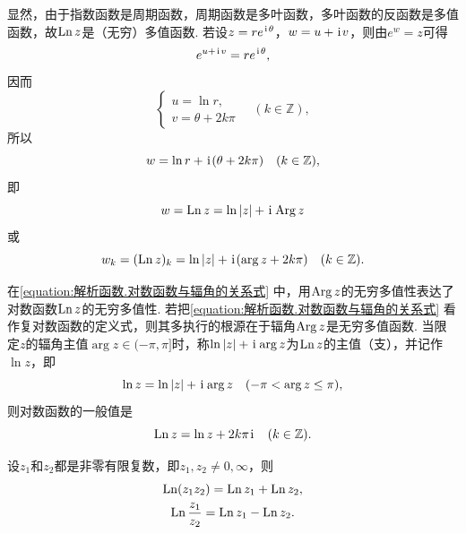 显然，由于指数函数是周期函数，周期函数是多叶函数，多叶函数的反函数是多值函数，故\(\operatorname{Ln} z\)是（无穷）多值函数.
若设\(z = r e^{\kern1pt\mathrm{i}\kern1pt\theta}\)，\(w = u + \kern1pt\mathrm{i}\kern1pt v\)，则由\(e^w = z\)可得\begin{equation*}
e^{u + \kern1pt\mathrm{i}\kern1pt v} = r e^{\kern1pt\mathrm{i}\kern1pt\theta},
\end{equation*}因而\begin{equation*}
\left\{ \begin{array}{l}
u = \ln r, \\
v = \theta+2k\pi
\end{array} \right.
\quad(k\in\mathbb{Z}),
\end{equation*}所以\begin{equation*}
w = \ln r + \kern1pt\mathrm{i}\kern1pt(\theta+2k\pi)
\quad(k\in\mathbb{Z}),
\end{equation*}即\begin{equation}\label{equation:解析函数.对数函数与辐角的关系式}
w = \operatorname{Ln} z = \ln\abs{z} + \kern1pt\mathrm{i}\kern1pt \operatorname{Arg} z
\end{equation}或\begin{equation*}
w_k = (\operatorname{Ln} z)_k = \ln\abs{z} + \kern1pt\mathrm{i}\kern1pt(\arg z + 2k\pi)
\quad(k\in\mathbb{Z}).
\end{equation*}

在\cref{equation:解析函数.对数函数与辐角的关系式} 中，用\(\operatorname{Arg} z\)的无穷多值性表达了对数函数\(\operatorname{Ln} z\)的无穷多值性.
若把\cref{equation:解析函数.对数函数与辐角的关系式} 看作复对数函数的定义式，则其多执行的根源在于辐角\(\operatorname{Arg} z\)是无穷多值函数.
当限定\(z\)的辐角主值\(\arg z \in (-\pi,\pi]\)时，称\(\ln\abs{z}+\kern1pt\mathrm{i}\kern1pt\arg z\)为\(\operatorname{Ln} z\)的主值（支），并记作\(\ln z\)，即\begin{equation}\label{equation:解析函数.对数函数的主值支}
\ln z = \ln\abs{z} + \kern1pt\mathrm{i}\kern1pt\arg z
\quad(-\pi < \arg z \leq \pi),
\end{equation}则对数函数的一般值是\begin{equation*}
\operatorname{Ln} z = \ln z + 2k\pi\kern1pt\mathrm{i}\kern1pt
\quad(k\in\mathbb{Z}).
\end{equation*}

\begin{theorem}
设\(z_1\)和\(z_2\)都是非零有限复数，即\(z_1,z_2\neq0,\infty\)，则\begin{gather}
\operatorname{Ln}(z_1 z_2) = \operatorname{Ln} z_1 + \operatorname{Ln} z_2, \\
\operatorname{Ln} \frac{z_1}{z_2} = \operatorname{Ln} z_1 - \operatorname{Ln} z_2.
\end{gather}
\end{theorem}

